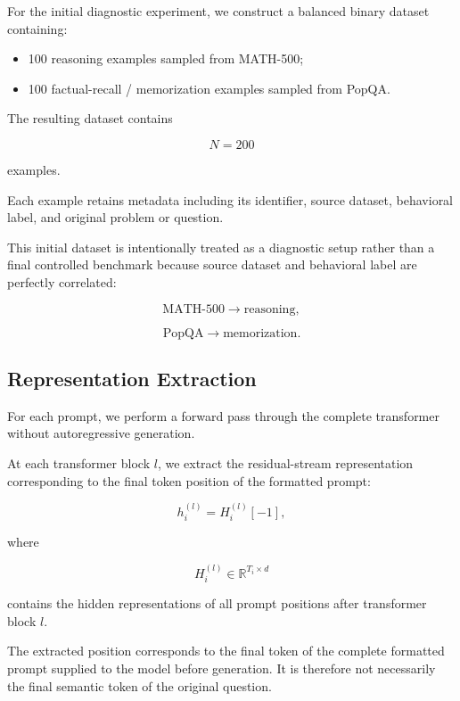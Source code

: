\documentclass[11pt]{article}
\begin{document}
For the initial diagnostic experiment, we construct a balanced binary
dataset containing:

\begin{itemize}

    \item 100 reasoning examples sampled from MATH-500;

    \item 100 factual-recall / memorization examples sampled from
    PopQA.

\end{itemize}

The resulting dataset contains

\[
N = 200
\]

examples.

Each example retains metadata including its identifier, source
dataset, behavioral label, and original problem or question.

This initial dataset is intentionally treated as a diagnostic setup
rather than a final controlled benchmark because source dataset and
behavioral label are perfectly correlated:

\[
\text{MATH-500} \rightarrow \text{reasoning},
\]

\[
\text{PopQA} \rightarrow \text{memorization}.
\]


\subsection{Representation Extraction}

For each prompt, we perform a forward pass through the complete
transformer without autoregressive generation.

At each transformer block \(l\), we extract the residual-stream
representation corresponding to the final token position of the
formatted prompt:

\[
h_i^{(l)}
=
H_i^{(l)}[-1],
\]

where

\[
H_i^{(l)}
\in
\mathbb{R}^{T_i \times d}
\]

contains the hidden representations of all prompt positions after
transformer block \(l\).

The extracted position corresponds to the final token of the complete
formatted prompt supplied to the model before generation. It is
therefore not necessarily the final semantic token of the original
question.
\end{document}
